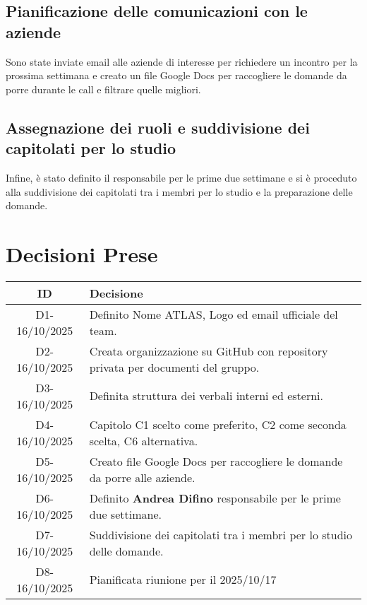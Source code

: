 \documentclass[a4paper,12pt]{article}
\begin{document}
{    \subsection{Pianificazione delle comunicazioni con le aziende}{
        Sono state inviate email alle aziende di interesse per richiedere un incontro per la prossima settimana e creato un file Google Docs per raccogliere le domande da porre durante le call e filtrare quelle migliori.  
        
    }

    \subsection{Assegnazione dei ruoli e suddivisione dei capitolati per lo studio}{
        Infine, è stato definito il responsabile per le prime due settimane e si è proceduto alla suddivisione dei capitolati tra i membri per lo studio e la preparazione delle domande.
    }

}


\section{Decisioni Prese}{
    \begin{center}
    \begin{tabular}{|c|p{11cm}|}
        \hline
        \textbf{ID} & \textbf{Decisione} \\
        \hline
        D1-16/10/2025 & Definito Nome ATLAS, Logo ed email ufficiale del team. \\
        \hline
        D2-16/10/2025 & Creata organizzazione su GitHub con repository privata per documenti del gruppo. \\
        \hline
        D3-16/10/2025 & Definita struttura dei verbali interni ed esterni. \\
        \hline
        D4-16/10/2025 & Capitolo C1 scelto come preferito, C2 come seconda scelta, C6 alternativa. \\
        \hline
        D5-16/10/2025 & Creato file Google Docs per raccogliere le domande da porre alle aziende. \\
        \hline
        D6-16/10/2025 & Definito \textbf{Andrea Difino} responsabile per le prime due settimane. \\
        \hline
        D7-16/10/2025 & Suddivisione dei capitolati tra i membri per lo studio delle domande. \\
        \hline
        D8-16/10/2025 & Pianificata riunione per il 2025/10/17 \\
        \hline
    \end{tabular}
    \end{center}
}
\end{document}
